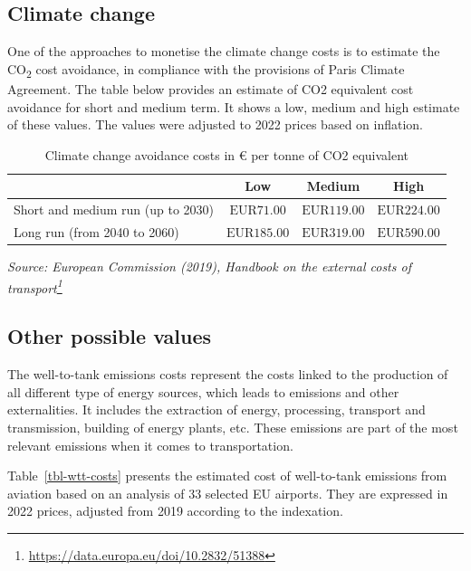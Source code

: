 \documentclass[
  11pt,
  a4paper,
]{book}
\DeclareRobustCommand{\href}[2]{#2\footnote{\url{#1}}}
\begin{document}
\hypertarget{climate-change}{%
\subsection{Climate change}\label{climate-change}}

One of the approaches to monetise the climate change costs is to
estimate the CO\textsubscript{2} cost avoidance, in compliance with the
provisions of Paris Climate Agreement. The table below provides an
estimate of CO2 equivalent cost avoidance for short and medium term. It
shows a low, medium and high estimate of these values. The values were
adjusted to 2022 prices based on inflation.

\hypertarget{tbl-climate-change-cost}{}
\setlength{\LTpost}{0mm}
\begin{longtable}{lccc}
\caption{\label{tbl-climate-change-cost}Climate change avoidance costs in € per tonne of CO2 equivalent }\tabularnewline

\toprule
  & Low & Medium & High \\ 
\midrule
Short and medium run (up to 2030) & $\text{EUR}71.00$ & $\text{EUR}119.00$ & $\text{EUR}224.00$ \\ 
Long run (from 2040 to 2060) & $\text{EUR}185.00$ & $\text{EUR}319.00$ & $\text{EUR}590.00$ \\ 
\bottomrule
\end{longtable}
\begin{minipage}{\linewidth}
\emph{Source: \href{https://data.europa.eu/doi/10.2832/51388}{European Commission (2019), Handbook on the external costs of transport}}\\
\end{minipage}

\hypertarget{other-possible-values}{%
\subsection{Other possible values}\label{other-possible-values}}

The well-to-tank emissions costs represent the costs linked to the
production of all different type of energy sources, which leads to
emissions and other externalities. It includes the extraction of energy,
processing, transport and transmission, building of energy plants, etc.
These emissions are part of the most relevant emissions when it comes to
transportation.

Table~\ref{tbl-wtt-costs} presents the estimated cost of well-to-tank
emissions from aviation based on an analysis of 33 selected EU airports.
They are expressed in 2022 prices, adjusted from 2019 according to the
indexation.
\end{document}
